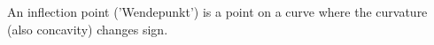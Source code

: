 An inflection point ('Wendepunkt') is a point on a curve where the curvature (also concavity) changes sign.
